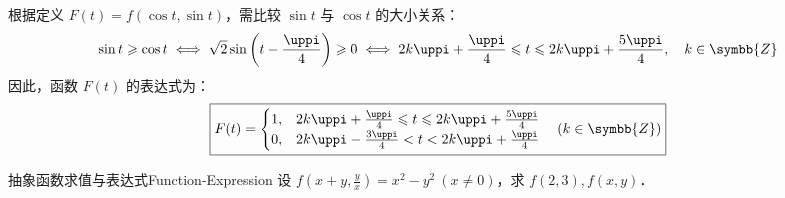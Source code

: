 \begin{solution}
    根据定义 $F(t) = f(\cos t, \sin t)$，需比较 $\sin t$ 与 $\cos t$ 的大小关系：
    \begin{equation}
        \sin t \geqslant \cos t \iff \sqrt{2}\sin\left( t - \frac{\uppi}{4} \right) \geqslant 0 \iff 2k\uppi + \frac{\uppi}{4} \leqslant t \leqslant 2k\uppi + \frac{5\uppi}{4}, \quad k \in \symbb{Z}
    \end{equation}
    因此，函数 $F(t)$ 的表达式为：
    \begin{equation}
        \boxed{F(t) = \begin{cases} 1, & 2k\uppi + \frac{\uppi}{4} \leqslant t \leqslant 2k\uppi + \frac{5\uppi}{4} \\ 0, & 2k\uppi - \frac{3\uppi}{4} < t < 2k\uppi + \frac{\uppi}{4} \end{cases} \quad (k \in \symbb{Z})}
    \end{equation}
\end{solution}

\begin{problem}{抽象函数求值与表达式}{Function-Expression}
    设 $f(x + y, \frac{y}{x}) = x^2 - y^2 \ (x \neq 0)$，求 $f(2, 3), f(x, y)$．
\end{problem}

